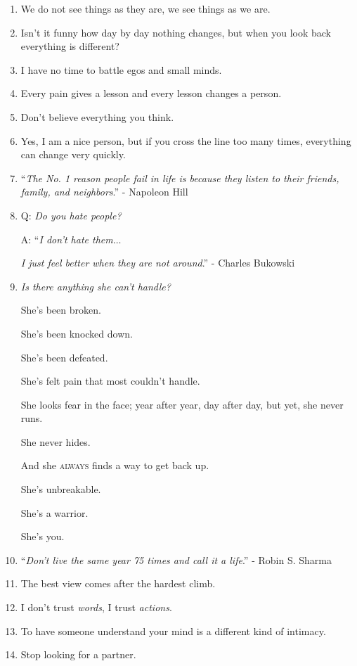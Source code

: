 \documentclass{article}
\numberwithin{equation}{section}
\begin{document}
\begin{enumerate}
    Be positive.
    \item We do not see things as they are, we see things as we are.
    \item Isn't it funny how day by day nothing changes, but when you look back everything is different?
    \item I have no time to battle egos and small minds.
    \item Every pain gives a lesson and every lesson changes a person.
    \item Don't believe everything you think.
    \item Yes, I am a nice person, but if you cross the line too many times, everything can change very quickly.
    \item ``\textit{The No. 1 reason people fail in life is because they listen to their friends, family, and neighbors}.'' - Napoleon Hill
    \item Q: \textit{Do you hate people?}
    
    A: ``\textit{I don't hate them}$\ldots$
    
    \textit{I just feel better when they are not around}.'' - Charles Bukowski
    \item \textit{Is there anything she can't handle?}
    
    She's been broken.
    
    She's been knocked down.
    
    She's been defeated.
    
    She's felt pain that most couldn't handle.
    
    She looks fear in the face; year after year, day after day, but yet, she never runs.
    
    She never hides.
    
    And she \textsc{always} finds a way to get back up.
    
    She's unbreakable.
    
    She's a warrior.
    
    She's you.
    \item ``\textit{Don't live the same year 75 times and call it a life}.'' - Robin S. Sharma
    \item The best view comes after the hardest climb.
    \item I don't trust \textit{words}, I trust \textit{actions}.
    \item To have someone understand your mind is a different kind of intimacy.
    \item Stop looking for a partner.
    

\end{enumerate}
\end{document}
